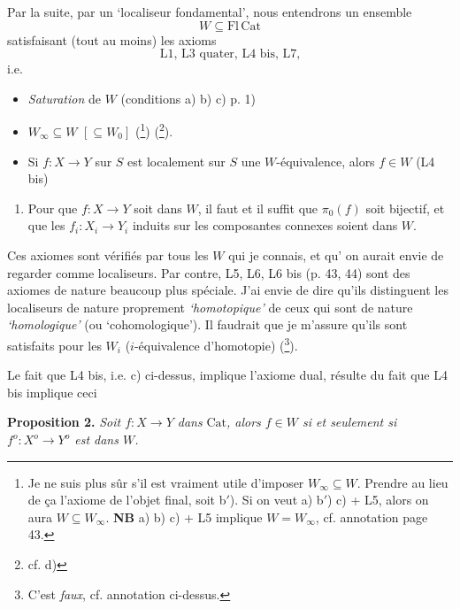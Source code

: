 \documentclass[11pt]{article}
\newcommand{\printedpage}[1]{\marginpar{\footnotesize p.~#1}}
\newcommand{\msp}[1]{\marginpar{\footnotesize [#1]}}
\newcommand{\Cat}{\mathrm{Cat}}
\begin{document}
\msp{page 45}
Par la suite, par un ‘localiseur fondamental’, nous entendrons un ensemble
\[
W \subseteq \mathrm{Fl}\,\mathrm{Cat}
\]
satisfaisant (tout au moins) les axioms %
\[
\text{L1, L3 quater, L4 bis, L7,}
\]
i.e.

\begin{itemize}
\item[a)] \textit{Saturation} de $W$ (conditions a) b) c) p. 1)

\item[b)] $W_\infty \subseteq W$ $[\subseteq W_0]$ (\footnote[30]{Je ne suis plus sûr s'il est vraiment utile d'imposer $W_\infty \subseteq W$. Prendre au lieu de ça l'axiome de l'objet final, soit b$'$). Si on veut a) b$'$) c) + L5, alors on aura $W \subseteq W_\infty$. \textbf{NB} a) b) c) + L5 implique $W = W_\infty$, cf. annotation page 43.}) (\footnote[31]{cf. d)}).

\item[c)] Si $f : X \longrightarrow Y$ sur $S$ est localement sur $S$ une $W$-équivalence, alors $f \in W$ (L4 bis)
\end{itemize}

\printedpage{29}

\begin{enumerate}[leftmargin=*]
\item[d)] Pour que $f : X \longrightarrow Y$ soit dans $W$, il faut et il suffit que $\pi_0(f)$ soit bijectif, et que les $f_i : X_i \longrightarrow Y_i$ induits sur les composantes connexes soient dans $W$.
\end{enumerate}

Ces axiomes sont vérifiés par tous les $W$ qui je connais, et qu' on aurait envie de regarder comme localiseurs. Par contre, L5, L6, L6 bis (p. 43, 44) sont des axiomes de nature beaucoup plus spéciale. J'ai envie de dire qu'ils distinguent les localiseurs de nature proprement \textit{`homotopique'} de ceux qui sont de nature \textit{`homologique'} (ou `cohomologique'). Il faudrait que je m'assure qu'ils sont satisfaits pour les $W_i$ ($i$-équivalence d'homotopie) (\footnote[32]{C'est \textit{faux}, cf. annotation ci-dessus.}). %

Le fait que L4 bis, i.e. c) ci-dessus, implique l'axiome dual, résulte du fait que L4 bis implique ceci

\textbf{Proposition 2.} \textit{Soit $f : X \longrightarrow Y$ dans} $\Cat$\textit{, alors $f \in W$ si et seulement si $f^o : X^o \longrightarrow Y^o$ est dans $W$.}
\end{document}
